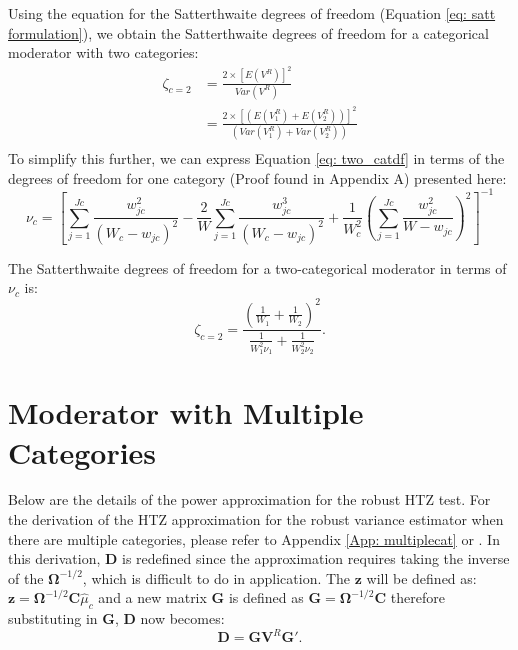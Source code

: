Using the equation for the Satterthwaite degrees of freedom (Equation \ref{eq: satt formulation}), we obtain the Satterthwaite degrees of freedom for a categorical moderator with two categories:
\begin{equation} 
    \begin{split}
        \zeta_{c = 2} & = \frac{2 \times [E(V^R)]^2}{Var(V^R)} \\
              & = \frac{2 \times \left[ \left(E(V^R_1) + E(V^R_2)  \right) \right]^2}{\left(Var(V^R_1) + Var(V^R_2)  \right)} \\
    \end{split}
    \label{eq: two_catdf}
\end{equation}
To simplify this further, we can express Equation \ref{eq: two_catdf} in terms of the degrees of freedom for one category (Proof found  in Appendix A) presented here: 
\begin{equation}
   \nu_c = \left[ \sum_{j = 1} ^{Jc} \frac{w^2_{jc}}{ (W_c - w_{jc}) ^2} - \frac{2}{W} \sum_{j = 1} ^{Jc} \frac{w_{jc}^3}{(W_c - w_{jc})^2} + \frac{1}{W_c^2} \left(\sum_{j = 1} ^{Jc} \frac{w_{jc}^2}{W-w_{jc}} \right)^2 \right]^{-1}
   \label{Eq: nu_c df}
\end{equation}

The Satterthwaite degrees of freedom for a two-categorical moderator in terms of $\nu_c$ is:
\begin{equation} \label{eq: two_catdf in nu_c df terms2}
    \zeta_{c=2} =
\frac{\left( \frac{1}{W_1} + \frac{1}{W_2} \right)^2}
{\frac{1}{W_1^2 \nu_1} + \frac{1}{W_2^2 \nu_2}}.
\end{equation}

 \section{Moderator with Multiple Categories}

Below are the details of the power approximation for the robust HTZ test. For the derivation of the HTZ approximation for the robust variance estimator when there are multiple categories, please refer to Appendix \ref{App: multiplecat} or \textcite{pustejovsky2024}. In this derivation, $\mathbf{D}$ is redefined since the approximation requires taking the inverse of the $\mathbf{\Omega}^{-1/2}$, which is difficult to do in application. The $\mathbf{z}$ will be defined as: $\mathbf{z} = \mathbf{\Omega}^{-1/2}\mathbf{C}\hat{\mu}_c $ and a new matrix $\bm{G}$ is defined as $\bm{G} = \bm{\Omega}^{-1/2}\mathbf{C} $ therefore substituting in $\bm{G}$, $\bm{D}$ now becomes:
\begin{equation}
    \mathbf{D} = \mathbf{G}\mathbf{V}^R\mathbf{G}'.
\end{equation}

